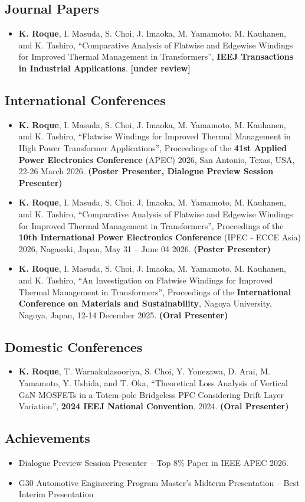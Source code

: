 \subsection*{Journal Papers}
\begin{itemize}
    \item \textbf{K. Roque}, I. Masuda, S. Choi, J. Imaoka, M. Yamamoto, M. Kauhanen, and K. Tashiro, ``Comparative Analysis of Flatwise and Edgewise Windings for Improved Thermal Management in Transformers'', \textbf{IEEJ Transactions in Industrial Applications}. \textbf{[under review]}
\end{itemize}

\subsection*{International Conferences}
\begin{itemize}
    \item \textbf{K. Roque}, I. Masuda, S. Choi, J. Imaoka, M. Yamamoto, M. Kauhanen, and K. Tashiro, ``Flatwise Windings for Improved Thermal Management in High Power Transformer Applications'', Proceedings of the \textbf{41st Applied Power Electronics Conference} (APEC) 2026, San Antonio, Texas, USA, 22-26 March 2026. \textbf{(Poster Presenter, Dialogue Preview Session Presenter)}
    
    \item \textbf{K. Roque}, I. Masuda, S. Choi, J. Imaoka, M. Yamamoto, M. Kauhanen, and K. Tashiro, ``Comparative Analysis of Flatwise and Edgewise Windings for Improved Thermal Management in Transformers'', Proceedings of the \textbf{10th International Power Electronics Conference} (IPEC - ECCE Asia) 2026, Nagasaki, Japan, May 31 -- June 04 2026. \textbf{(Poster Presenter)}
    
    \item \textbf{K. Roque}, I. Masuda, S. Choi, J. Imaoka, M. Yamamoto, M. Kauhanen, and K. Tashiro, ``An Investigation on Flatwise Windings for Improved Thermal Management in Transformers'', Proceedings of the \textbf{International Conference on Materials and Sustainability}, Nagoya University, Nagoya, Japan, 12-14 December 2025. \textbf{(Oral Presenter)}
    
\end{itemize}

\subsection*{Domestic Conferences}
\begin{itemize}
    \item \textbf{K. Roque}, T. Warnakulasooriya, S. Choi, Y. Yonezawa, D. Arai, M. Yamamoto, Y. Ushida, and T. Oka, ``Theoretical Loss Analysis of Vertical GaN MOSFETs in a Totem-pole Bridgeless PFC Considering Drift Layer Variation'', \textbf{2024 IEEJ National Convention}, 2024. \textbf{(Oral Presenter)}
\end{itemize}

\subsection*{Achievements}
\begin{itemize}
    \item Dialogue Preview Session Presenter -- Top 8\% Paper in IEEE APEC 2026.
    \item G30 Automotive Engineering Program Master's Midterm Presentation -- Best Interim Presentation
\end{itemize}